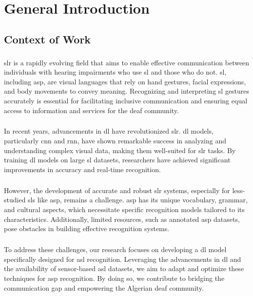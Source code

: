 \chapter*{General Introduction}
\section*{Context of Work}
\paragraph{}
\ac{slr} is a rapidly evolving field that aims to enable effective communication between individuals with hearing impairments who use \ac{sl} and those who do not. \ac{sl}, including \ac{asp}, are visual languages that rely on hand gestures, facial expressions, and body movements to convey meaning. Recognizing and interpreting \ac{sl} gestures accurately is essential for facilitating inclusive communication and ensuring equal access to information and services for the deaf community.
\paragraph{}
In recent years, advancements in \ac{dl} have revolutionized \ac{slr}. \ac{dl} models, particularly \ac{cnn} and \ac{rnn}, have shown remarkable success in analyzing and understanding complex visual data, making them well-suited for \ac{slr} tasks. By training \ac{dl} models on large \ac{sl} datasets, researchers have achieved significant improvements in accuracy and real-time recognition.
\paragraph{}
However, the development of accurate and robust \ac{slr} systems, especially for less-studied \ac{sl}s like \ac{asp}, remains a challenge. \ac{asp} has its unique vocabulary, grammar, and cultural aspects, which necessitate specific recognition models tailored to its characteristics. Additionally, limited resources, such as annotated \ac{asp} datasets, pose obstacles in building effective recognition systems.
\paragraph{}
To address these challenges, our research focuses on developing a \ac{dl} model specifically designed for \ac{asl} recognition. Leveraging the advancements in \ac{dl} and the availability of sensor-based \ac{asl} datasets, we aim to adapt and optimize these techniques for \ac{asp} recognition. By doing so, we contribute to bridging the communication gap and empowering the Algerian deaf community.
